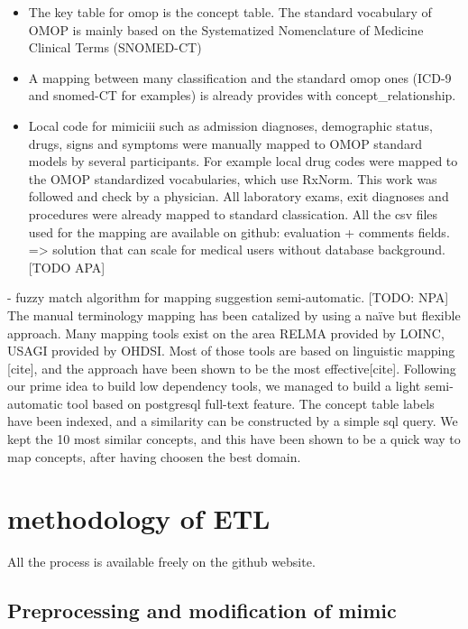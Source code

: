 \begin{itemize}
\tightlist
\item
  The key table for omop is the concept table. The standard vocabulary
  of OMOP is mainly based on the Systematized Nomenclature of Medicine
  Clinical Terms (SNOMED-CT)
\item
  A mapping between many classification and the standard omop ones
  (ICD-9 and snomed-CT for examples) is already provides with
  concept\_relationship.
\item
  Local code for mimiciii such as admission diagnoses, demographic
  status, drugs, signs and symptoms were manually mapped to OMOP
  standard models by several participants. For example local drug codes
  were mapped to the OMOP standardized vocabularies, which use RxNorm.
  This work was followed and check by a physician. All laboratory exams,
  exit diagnoses and procedures were already mapped to standard
  classication. All the csv files used for the mapping are available on
  github: evaluation + comments fields. =\textgreater{} solution that
  can scale for medical users without database background. {[}TODO
  APA{]}
\end{itemize}

- fuzzy match algorithm for mapping suggestion semi-automatic. {[}TODO:
NPA{]} The manual terminology mapping has been catalized by using a
naïve but flexible approach. Many mapping tools exist on the area RELMA
provided by LOINC, USAGI provided by OHDSI. Most of those tools are
based on linguistic mapping {[}cite{]}, and the approach have been shown
to be the most effective{[}cite{]}. Following our prime idea to build
low dependency tools, we managed to build a light semi-automatic tool
based on postgresql full-text feature. The concept table labels have
been indexed, and a similarity can be constructed by a simple sql query.
We kept the 10 most similar concepts, and this have been shown to be a
quick way to map concepts, after having choosen the best domain.

\section{methodology of ETL}\label{methodology-of-etl}

All the process is available freely on the github website.

\subsection{Preprocessing and modification of
mimic}\label{preprocessing-and-modification-of-mimic}

